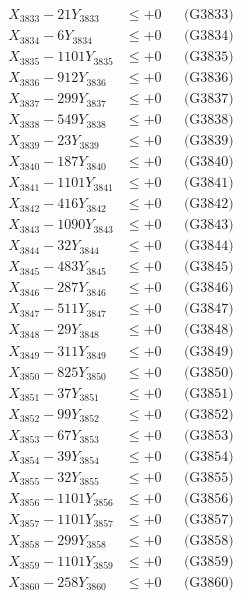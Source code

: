 \documentclass[a4paper,10pt]{article}
\begin{document}
{\begin{align}
X_{3833} - 21Y_{3833} &\leq +0 && \text{(G3833)} \\
X_{3834} - 6Y_{3834} &\leq +0 && \text{(G3834)} \\
X_{3835} - 1101Y_{3835} &\leq +0 && \text{(G3835)} \\
X_{3836} - 912Y_{3836} &\leq +0 && \text{(G3836)} \\
X_{3837} - 299Y_{3837} &\leq +0 && \text{(G3837)} \\
X_{3838} - 549Y_{3838} &\leq +0 && \text{(G3838)} \\
X_{3839} - 23Y_{3839} &\leq +0 && \text{(G3839)} \\
X_{3840} - 187Y_{3840} &\leq +0 && \text{(G3840)} \\
\allowbreak
X_{3841} - 1101Y_{3841} &\leq +0 && \text{(G3841)} \\
X_{3842} - 416Y_{3842} &\leq +0 && \text{(G3842)} \\
X_{3843} - 1090Y_{3843} &\leq +0 && \text{(G3843)} \\
X_{3844} - 32Y_{3844} &\leq +0 && \text{(G3844)} \\
X_{3845} - 483Y_{3845} &\leq +0 && \text{(G3845)} \\
X_{3846} - 287Y_{3846} &\leq +0 && \text{(G3846)} \\
X_{3847} - 511Y_{3847} &\leq +0 && \text{(G3847)} \\
X_{3848} - 29Y_{3848} &\leq +0 && \text{(G3848)} \\
X_{3849} - 311Y_{3849} &\leq +0 && \text{(G3849)} \\
X_{3850} - 825Y_{3850} &\leq +0 && \text{(G3850)} \\
\allowbreak
X_{3851} - 37Y_{3851} &\leq +0 && \text{(G3851)} \\
X_{3852} - 99Y_{3852} &\leq +0 && \text{(G3852)} \\
X_{3853} - 67Y_{3853} &\leq +0 && \text{(G3853)} \\
X_{3854} - 39Y_{3854} &\leq +0 && \text{(G3854)} \\
X_{3855} - 32Y_{3855} &\leq +0 && \text{(G3855)} \\
X_{3856} - 1101Y_{3856} &\leq +0 && \text{(G3856)} \\
X_{3857} - 1101Y_{3857} &\leq +0 && \text{(G3857)} \\
X_{3858} - 299Y_{3858} &\leq +0 && \text{(G3858)} \\
X_{3859} - 1101Y_{3859} &\leq +0 && \text{(G3859)} \\
X_{3860} - 258Y_{3860} &\leq +0 && \text{(G3860)} \\

\end{align}}
\end{document}
